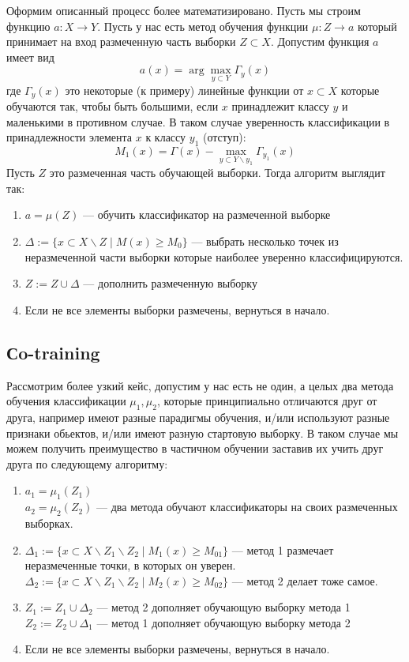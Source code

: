 Оформим описанный процесс более математизировано. Пусть мы строим функцию $a: X \longrightarrow Y$. Пусть у нас есть метод обучения функции $\mu: Z \longrightarrow a$ который принимает на вход размеченную часть выборки $Z \subset X$. Допустим функция $a$ имеет вид
\begin{equation*}
    a(x) = \arg \max_{y \subset Y}\Gamma_y(x)
\end{equation*}
где $\Gamma_y(x)$ это некоторые (к примеру) линейные функции от $x \subset X$ которые обучаются так, чтобы быть большими, если $x$ принадлежит классу $y$ и маленькими в противном случае. В таком случае уверенность классификации в принадлежности элемента $x$ к классу $y_1$ (отступ):
\begin{equation*}
    M_1(x) = \Gamma(x) - \max_{y \subset Y\backslash y_1}\Gamma_{y_1}(x) 
\end{equation*}
Пусть $Z$ это размеченная часть обучающей выборки. Тогда алгоритм выглядит так:
\begin{enumerate}
  \item $a = \mu(Z)$ --- обучить классификатор на размеченной выборке
  \item $\Delta := \{x \subset X\backslash Z \;|\; M(x) \geq M_0 \}$ --- выбрать несколько точек из неразмеченной части выборки которые наиболее уверенно классифицируются. 
  \item $Z := Z\cup\Delta$ --- дополнить размеченную выборку
  \item Если не все элементы выборки размечены, вернуться в начало.
\end{enumerate}
\subsection{Сo-training}
Рассмотрим более узкий кейс, допустим у нас есть не один, а целых два метода обучения классификации $\mu_1, \mu_2$, которые принципиально отличаются друг от друга, например имеют разные парадигмы обучения, и/или используют разные признаки обьектов, и/или имеют разную стартовую выборку. В таком случае мы можем получить преимущество в частичном обучении заставив их учить друг друга по следующему алгоритму:
\begin{enumerate}
  \item $a_1 = \mu_1(Z_1)$\\
  $a_2 = \mu_2(Z_2)$ --- два метода обучают классификаторы на своих размеченных выборках. 
  \item $\Delta_1 := \{x \subset X\backslash Z_1\backslash Z_2 \;|\; M_1(x) \geq M_{01} \}$ --- метод 1 размечает неразмеченные точки, в которых он уверен.\\
  $\Delta_2 := \{x \subset X\backslash Z_1\backslash Z_2 \;|\; M_2(x) \geq M_{02} \}$ --- метод 2 делает тоже самое.
  \item $Z_1 := Z_1\cup\Delta_2$ --- метод 2 дополняет обучающую выборку метода 1 \\
  $Z_2 := Z_2\cup\Delta_1$ --- метод 1 дополняет обучающую выборку метода 2
  \item Если не все элементы выборки размечены, вернуться в начало.
\end{enumerate}
